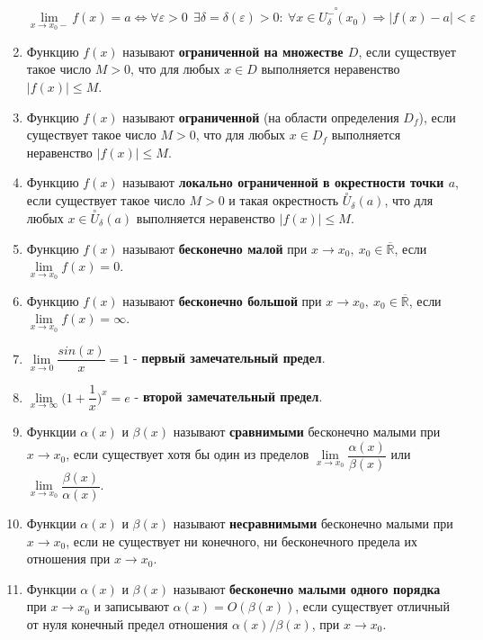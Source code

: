 \begin{enumerate}
$$\lim\limits_{x \to x_0 -} f(x) = a \iff \forall{\varepsilon} > 0 \ \ \exists \delta = \delta({\varepsilon}) > 0 : \ \forall x \in {\overset{\circ\hspace{22pt}}{U^-_\delta(x_0)}}  \Rightarrow | f(x) - a|  < {\varepsilon}
    $$
\item Функцию $f(x)$ называют \textbf{ограниченной на множестве $D$}, если существует такое число $M > 0$, что для любых $x \in D$ выполняется неравенство $\mid  f(x)\mid   \leqslant M$.
\item Функцию $f(x)$ называют \textbf{ограниченной} (на области определения $D_f$), если существует такое число $M > 0$, что для любых $x \in D_f$ выполняется неравенство $\mid  f(x)\mid   \leqslant M$.
\item Функцию $f(x)$ называют \textbf{локально ограниченной в окрестности точки $a$}, если существует такое число $M > 0$ и такая окрестность $\overset{\circ}U_\delta(a)$, что для любых $x \in \overset{\circ}U_\delta(a)$ выполняется неравенство $\mid  f(x)\mid   \leqslant M$.
\item Функцию $f(x)$ называют \textbf{бесконечно малой} при $x \rightarrow x_0, \ x_0 \in \overline{\mathbb{R}}$, если $\lim\limits_{x \to x_0} f(x) = 0$.
\item Функцию $f(x)$ называют \textbf{бесконечно большой} при $x \rightarrow x_0, \ x_0 \in \overline{\mathbb{R}}$, если $\lim\limits_{x \to x_0} f(x) = \infty$.
\item $\lim\limits_{x \to 0} {\dfrac{sin(x)}{x}} = 1$ - \textbf{первый замечательный предел}.
\item $\lim\limits_{x \to \infty} \bigg(1 + {\dfrac{1}{x}}\bigg)^{x} = e$ - \textbf{второй замечательный предел}.
\item Функции $\alpha(x)$ и $\beta(x)$ называют \textbf{сравнимыми} бесконечно малыми при $x \rightarrow x_0$, если существует хотя бы один из пределов $\lim\limits_{x \to x_0} { \dfrac{\alpha(x)}{\beta(x)}}$ или $\lim\limits_{x \to x_0} { \dfrac{\beta(x)}{\alpha(x)}}$.
\item Функции $\alpha(x)$ и $\beta(x)$ называют \textbf{несравнимыми} бесконечно малыми при $x \rightarrow x_0$, если не существует ни конечного, ни бесконечного предела их отношения при $x \rightarrow x_0$.
\item Функции $\alpha(x)$ и $\beta(x)$ называют \textbf{бесконечно малыми одного порядка} при $x \rightarrow x_0$ и записывают $\alpha(x) = O(\beta(x))$, если существует отличный от нуля конечный предел отношения $\alpha(x)/\beta(x)$, при $x \rightarrow x_0$.


\end{enumerate}
